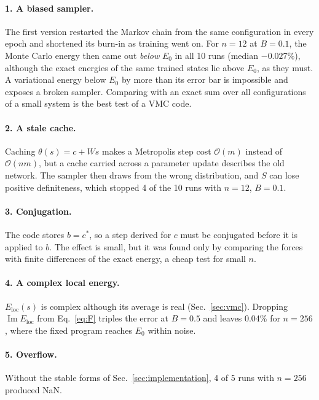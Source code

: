\documentclass[aps,prb,preprint,amsmath,amssymb,nofootinbib,longbibliography]{revtex4-2}
\newcommand{\Eloc}{E_{\mathrm{loc}}}
\renewcommand{\Im}{\operatorname{Im}}
\begin{document}
\paragraph*{1. A biased sampler.} The first version restarted the Markov chain from the same configuration in every
epoch and shortened its burn-in as training went on. For $n = 12$ at $B = 0.1$, the Monte Carlo energy then came out
\emph{below} $E_0$ in all 10 runs (median $-0.027\%$), although the exact energies of the same trained states lie
above $E_0$, as they must. A variational energy below $E_0$ by more than its error bar is impossible and exposes a
broken sampler. Comparing with an exact sum over all configurations of a small system is the best test of a VMC code.

\paragraph*{2. A stale cache.} Caching $\theta(s) = c + Ws$ makes a Metropolis step cost $\mathcal{O}(m)$ instead of
$\mathcal{O}(nm)$, but a cache carried across a parameter update describes the old network. The sampler then draws
from the wrong distribution, and $S$ can lose positive definiteness, which stopped 4 of the 10 runs with $n = 12$,
$B = 0.1$.

\paragraph*{3. Conjugation.} The code stores $b = c^*$, so a step derived for $c$ must be conjugated before it is
applied to $b$. The effect is small, but it was found only by comparing the forces with finite differences of the
exact energy, a cheap test for small $n$.

\paragraph*{4. A complex local energy.} $\Eloc(s)$ is complex although its average is real (Sec.~\ref{sec:vmc}).
Dropping $\Im\Eloc$ from Eq.~\eqref{eq:F} triples the error at $B = 0.5$ and leaves 0.04\% for $n = 256$, where the
fixed program reaches $E_0$ within noise.

\paragraph*{5. Overflow.} Without the stable forms of Sec.~\ref{sec:implementation}, 4 of 5 runs with $n = 256$
produced NaN.
\end{document}
